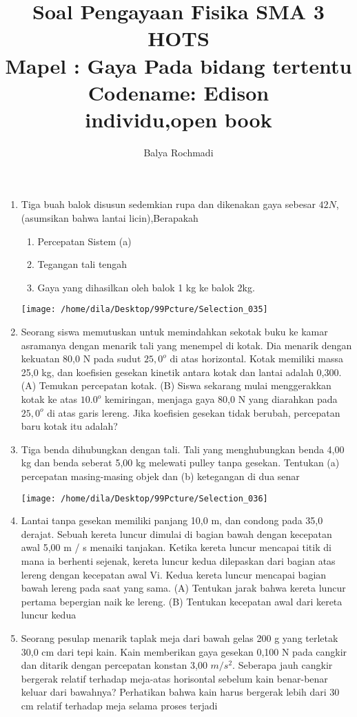 \documentclass[12pt,a4paper,draft,final,oneside,twoside,openright,openany]{article}
\author{Balya Rochmadi}
\title{Soal Pengayaan Fisika SMA 3 HOTS\\ Mapel : Gaya Pada bidang tertentu\\Codename: Edison\\ \small individu,open book}
\begin{document}
	\maketitle
	\Large
	\begin{enumerate}
		\item Tiga buah balok disusun sedemkian rupa dan dikenakan gaya sebesar $42 N$, (asumsikan bahwa lantai licin),Berapakah
		\begin{enumerate}
			\item Percepatan Sistem (a)
			\item Tegangan tali tengah
			\item Gaya yang dihasilkan oleh balok 1 kg ke balok 2kg.
		\end{enumerate}
		\begin{center}
			\texttt{[image: /home/dila/Desktop/99Pcture/Selection\_035]}
		\end{center}
		
		\item Seorang siswa memutuskan untuk memindahkan sekotak buku ke kamar asramanya dengan menarik tali yang menempel di kotak. Dia menarik dengan kekuatan 80,0 N pada sudut $25,0^o$ di atas horizontal. Kotak memiliki massa 25,0 kg, dan koefisien gesekan kinetik antara kotak dan lantai adalah 0,300. (A) Temukan percepatan kotak.
		(B) Siswa sekarang mulai menggerakkan kotak ke atas $10.0^o$ kemiringan, menjaga gaya 80,0 N yang diarahkan pada $25,0^o$ di atas garis lereng. Jika koefisien gesekan tidak berubah, percepatan baru kotak itu adalah?
		
		\item Tiga benda dihubungkan dengan tali. Tali yang menghubungkan benda 4,00 kg
		dan benda seberat 5,00 kg melewati pulley tanpa gesekan.
		Tentukan (a) percepatan masing-masing objek dan (b) ketegangan di dua senar
		 	\begin{center}
		 		\texttt{[image: /home/dila/Desktop/99Pcture/Selection\_036]}
		 	\end{center}
		\item Lantai tanpa gesekan memiliki panjang 10,0 m, dan condong pada 35,0 derajat. Sebuah kereta luncur dimulai di bagian bawah dengan kecepatan awal 5,00 m / s menaiki tanjakan. Ketika kereta luncur mencapai titik di mana ia berhenti sejenak, kereta luncur kedua dilepaskan dari bagian atas lereng dengan kecepatan awal Vi. Kedua kereta luncur mencapai bagian bawah lereng pada saat yang sama. (A) Tentukan jarak bahwa kereta luncur pertama bepergian naik ke lereng. (B) Tentukan kecepatan awal dari kereta luncur kedua
		\item 	Seorang pesulap menarik taplak meja dari bawah gelas 200 g yang terletak 30,0 cm dari tepi kain. Kain memberikan gaya gesekan 0,100 N pada cangkir dan ditarik dengan percepatan konstan 3,00 $m/s^2$. Seberapa jauh cangkir bergerak relatif terhadap meja-atas horisontal sebelum kain benar-benar keluar dari bawahnya? Perhatikan bahwa kain harus bergerak lebih dari 30 cm relatif terhadap meja selama proses terjadi
				
	\end{enumerate}
\end{document}
